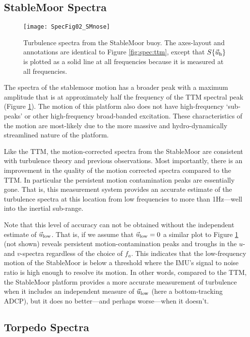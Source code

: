 \subsection{StableMoor Spectra}

\begin{figure*}[t]
  \centering
  \texttt{[image: SpecFig02\_SMnose]}
  \caption{Turbulence spectra from the StableMoor buoy. The axes-layout and annotations are identical to Figure \ref{fig:spec:ttm}, except that $S\{\vec{u}_\mathrm{h}\}$ is plotted as a solid line at all frequencies because it is measured at all frequencies. }
  \label{fig:spec:sm}
\end{figure*}

The spectra of the stablemoor motion has a broader peak with a maximum amplitude that is at approximately half the frequency of the TTM spectral peak (Figure \ref{fig:spec:sm}). The motion of this platform also does not have high-frequency `sub-peaks' or other high-frequency broad-banded excitation. These characteristics of the motion are most-likely due to the more massive and hydro-dynamically streamlined nature of the platform. 

Like the TTM, the motion-corrected spectra from the StableMoor are consistent with turbulence theory and previous observations. Most importantly, there is an improvement in the quality of the motion corrected spectra compared to the TTM. In particular the persistent motion contamination peaks are essentially gone. That is, this measurement system provides an accurate estimate of the turbulence spectra at this location from low frequencies to more than 1Hz---well into the inertial sub-range.

Note that this level of accuracy can not be obtained without the independent estimate of $\vec{u}_\mathrm{low}$. That is, if we assume that $\vec{u}_\mathrm{low}=0$ a similar plot to Figure \ref{fig:spec:sm} (not shown) reveals persistent motion-contamination peaks and troughs in the $u$- and $v$-spectra regardless of the choice of $f_a$. This indicates that the low-frequency motion of the StableMoor is below a threshold where the IMU's signal to noise ratio is high enough to resolve its motion. In other words, compared to the TTM, the StableMoor platform provides a more accurate measurement of turbulence when it includes an independent measure of $\vec{u}_\mathrm{low}$ (here a bottom-tracking ADCP), but it does no better---and perhaps worse---when it doesn't.

\subsection{Torpedo Spectra}

